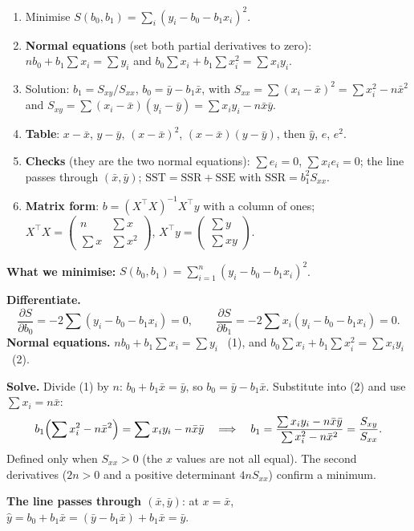 \documentclass[11pt]{article}
\newcommand{\method}[1]{\begin{keyidea}[The method: #1]}
\begin{document}
\method{fitting $\hat y = b_0 + b_1x$}
\begin{enumerate}
  \item Minimise $S(b_0, b_1) = \sum_i (y_i - b_0 - b_1x_i)^2$.
  \item \textbf{Normal equations} (set both partial derivatives to zero):
    $nb_0 + b_1\sum x_i = \sum y_i$ and $b_0\sum x_i + b_1\sum x_i^2 = \sum
    x_iy_i$.
  \item Solution: $b_1 = S_{xy}/S_{xx}$, $b_0 = \bar y - b_1\bar x$, with
    $S_{xx} = \sum(x_i - \bar x)^2 = \sum x_i^2 - n\bar x^2$ and
    $S_{xy} = \sum(x_i - \bar x)(y_i - \bar y) = \sum x_iy_i - n\bar x\bar y$.
  \item \textbf{Table}: $x - \bar x$, $y - \bar y$, $(x - \bar x)^2$,
    $(x - \bar x)(y - \bar y)$, then $\hat y$, $e$, $e^2$.
  \item \textbf{Checks} (they are the two normal equations): $\sum e_i = 0$,
    $\sum x_ie_i = 0$; the line passes through $(\bar x, \bar y)$;
    $\mathrm{SST} = \mathrm{SSR} + \mathrm{SSE}$ with $\mathrm{SSR} =
    b_1^2S_{xx}$.
  \item \textbf{Matrix form}: $b = (X^\top X)^{-1}X^\top y$ with a column of
    ones; $X^\top X = \begin{pmatrix} n & \sum x\\ \sum x & \sum
    x^2\end{pmatrix}$, $X^\top y = \begin{pmatrix}\sum y\\ \sum
    xy\end{pmatrix}$.
\end{enumerate}
\end{keyidea}

\begin{worked}
\textbf{What we minimise:} $S(b_0, b_1) = \sum_{i=1}^{n}(y_i - b_0 -
b_1x_i)^2$.

\textbf{Differentiate.}
\[
  \frac{\partial S}{\partial b_0} = -2\sum(y_i - b_0 - b_1x_i) = 0,
  \qquad
  \frac{\partial S}{\partial b_1} = -2\sum x_i(y_i - b_0 - b_1x_i) = 0 .
\]
\textbf{Normal equations.} $nb_0 + b_1\sum x_i = \sum y_i$ \ (1), and
$b_0\sum x_i + b_1\sum x_i^2 = \sum x_iy_i$ \ (2).

\textbf{Solve.} Divide (1) by $n$: $b_0 + b_1\bar x = \bar y$, so $b_0 =
\bar y - b_1\bar x$. Substitute into (2) and use $\sum x_i = n\bar x$:
\[
  b_1\Bigl(\sum x_i^2 - n\bar x^2\Bigr) = \sum x_iy_i - n\bar x\bar y
  \quad\Longrightarrow\quad
  b_1 = \frac{\sum x_iy_i - n\bar x\bar y}{\sum x_i^2 - n\bar x^2}
      = \frac{S_{xy}}{S_{xx}} .
\]
Defined only when $S_{xx} > 0$ (the $x$ values are not all equal). The
second derivatives ($2n > 0$ and a positive determinant $4nS_{xx}$) confirm a
minimum.

\textbf{The line passes through $(\bar x, \bar y)$}: at $x = \bar x$,
$\hat y = b_0 + b_1\bar x = (\bar y - b_1\bar x) + b_1\bar x = \bar y$.
\end{worked}
\end{document}
